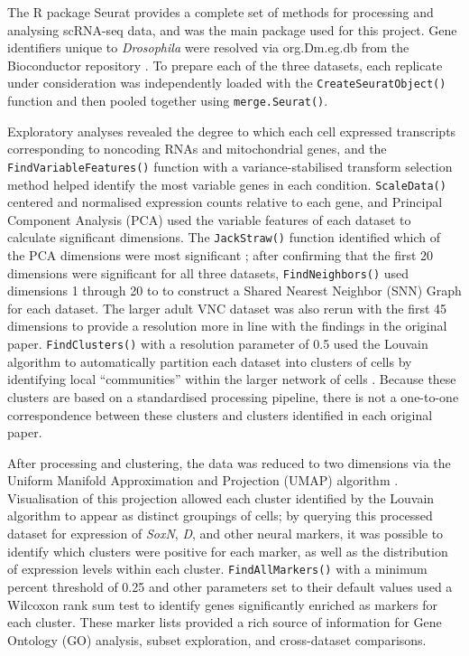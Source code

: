 \documentclass[withindex,glossary]{cam-thesis}
\newcommand{\code}[1]{\mbox{\texttt{#1}}} %
\begin{document}
The R package Seurat  provides a complete set of
methods for processing and analysing scRNA-seq data, and was the main
package used for this project. Gene identifiers unique to
\emph{Drosophila} were resolved via org.Dm.eg.db from the Bioconductor
repository . To
prepare each of the three datasets, each replicate under consideration
was independently loaded with the \code{CreateSeuratObject()} function and then
pooled together using \code{merge.Seurat()}.

Exploratory analyses revealed the degree to which each cell expressed
transcripts corresponding to noncoding RNAs and mitochondrial genes, and
the \code{FindVariableFeatures()} function with a variance-stabilised transform
selection method helped identify the most variable genes in each
condition. \code{ScaleData()} centered and normalised expression counts
relative to each gene, and Principal Component Analysis (\gls{PCA}) used the
variable features of each dataset to calculate significant dimensions.
The \code{JackStraw()} function identified which of the PCA dimensions were
most significant ; after confirming that the
first 20 dimensions were significant for all three datasets,
\code{FindNeighbors()} used dimensions 1 through 20 to to construct a Shared
Nearest Neighbor (\gls{SNN}) Graph for each dataset. The larger adult VNC
dataset was also rerun with the first 45 dimensions to provide a
resolution more in line with the findings in the original paper.
\code{FindClusters()} with a resolution parameter of 0.5 used the Louvain
algorithm to automatically partition each dataset into clusters of cells
by identifying local ``communities'' within the larger network of cells
. Because these clusters
are based on a standardised processing pipeline, there is not a
one-to-one correspondence between these clusters and clusters identified
in each original paper.

After processing and clustering, the data was reduced to two dimensions
via the Uniform Manifold Approximation and Projection (\gls{UMAP}) algorithm
. Visualisation of this projection allowed each
cluster identified by the Louvain algorithm to appear as distinct
groupings of cells; by querying this processed dataset for expression of
\emph{SoxN}, \emph{D}, and other neural markers, it was possible to
identify which clusters were positive for each marker, as well as the
distribution of expression levels within each cluster. \code{FindAllMarkers()}
with a minimum percent threshold of 0.25 and other parameters set to
their default values used a Wilcoxon rank sum test to identify genes
significantly enriched as markers for each cluster. These marker lists
provided a rich source of information for Gene Ontology (\gls{GO}) analysis,
subset exploration, and cross-dataset comparisons.
\end{document}
